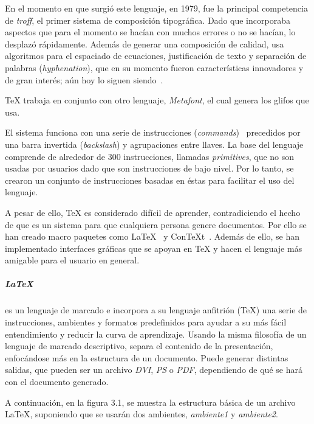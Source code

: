 \documentclass[12pt,letterpaper,titlepage,oneside,openright]{book}
\newcommand{\latex}{\LaTeX\xspace}
\newcommand{\tex}{\TeX\xspace}
\begin{document}
En el momento en que surgió este lenguaje, en 1979, fue la principal competencia de \textit{troff}, el primer sistema de composición tipográfica. Dado que incorporaba aspectos que para el momento se hacían con muchos errores o no se hacían, lo desplazó rápidamente. Además de generar una composición de calidad, usa algoritmos para el espaciado de ecuaciones, justificación de texto y separación de palabras (\textit{hyphenation}), que en su momento fueron características innovadores y de gran interés; aún hoy lo siguen siendo~\cite{knuth1999digital}.

\tex trabaja en conjunto con otro lenguaje, \textit{Metafont}, el cual genera los glifos que usa.

El sistema funciona con una serie de instrucciones (\textit{commands})~\cite{knuth1984texbook} precedidos por una barra invertida (\textit{backslash}) y agrupaciones entre llaves. La base del lenguaje comprende de alrededor de 300 instrucciones, llamadas \textit{primitives}, que no son usadas por usuarios dado que son instrucciones de bajo nivel. Por lo tanto, se crearon un conjunto de instrucciones basadas en éstas para facilitar el uso del lenguaje.

A pesar de ello, \tex es considerado difícil de aprender, contradiciendo el hecho de que es un sistema para que cualquiera persona genere documentos. Por ello se han creado macro paquetes como \latex~\cite{weblatexhp} y Con\TeX t~\cite{webcontexthp}. Además de ello, se han implementado interfaces gráficas que se apoyan en \tex y hacen el lenguaje más amigable para el usuario en general.

\subparagraph{\latex}es un lenguaje de marcado e incorpora a su lenguaje anfitrión (\tex) una serie de instrucciones, ambientes y formatos predefinidos para ayudar a su más fácil entendimiento y reducir la curva de aprendizaje. Usando la misma filosofía de un lenguaje de marcado descriptivo, separa el contenido de la presentación, enfocándose más en la estructura de un documento. Puede generar distintas salidas, que pueden ser un archivo \textit{DVI}, \textit{PS} o \textit{PDF}, dependiendo de qué se hará con el documento generado.

A continuación, en la figura 3.1, se muestra la estructura básica de un archivo \latex, suponiendo que se usarán dos ambientes, \textit{ambiente1} y \textit{ambiente2}.
\end{document}
